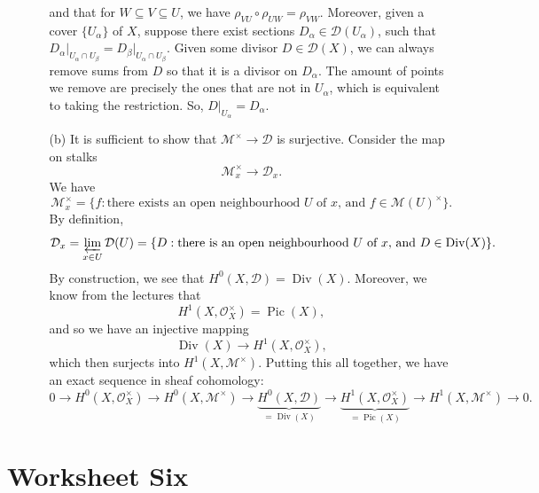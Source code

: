 \documentclass[a4paper]{report}
\theoremstyle{definition}
\theoremstyle{remark}
\theoremstyle{proposition}
\theoremstyle{conjecture}
\theoremstyle{lemma}
\theoremstyle{corollary}
\theoremstyle{exercise}
\theoremstyle{example}
\newcommand{\mcal}{\mathcal}
\newcommand{\on}{\operatorname}
\begin{document}
\begin{enumerate}
\begin{itemize}
                and that for $W \subseteq V \subseteq U$, 
                we have $\rho_{VU}\circ \rho_{UW} = \rho_{VW}.$
                Moreover, given a cover $\lbrace U_\alpha \rbrace$ of $X$, suppose
                there exist sections $D_\alpha \in \mcal{D}(U_\alpha)$, 
                such that $D_\alpha \vert_{U_\alpha \cap U_\beta} = D_\beta\vert_{U_\alpha \cap U_\beta}$. Given some divisor $D \in \mcal{D}(X)$, we can always
                remove sums from $D$ so that it is a divisor on $D_\alpha$.
                The amount of points we remove are precisely the ones that are not 
                in $U_\alpha$, which is equivalent to taking the restriction.
                So, $D\vert_{U_\alpha} = D_\alpha$.

            \item[(b)] It is sufficient to show that 
                $\mcal{M}^\times \to \mcal{D}$ is surjective.
                Consider the map on stalks 
                $$\mcal{M}^\times_x \longrightarrow \mcal{D}_x.$$
                We have $$\mcal{M}_x^\times = \lbrace f : \text{there exists an
                open neighbourhood $U$ of $x$, and $f\in\mcal{M}(U)^\times$}\rbrace.$$
                By definition,
                $$\mcal{D}_x = \varprojlim_{x \in U}\mcal{D}(U) = \lbrace D : \text{there is an open neighbourhood $U$ of $x$, and $D\in \on{Div}(X)$}\rbrace.$$
                By construction, we see that $H^0(X,\mcal{D}) = \on{Div}(X)$.
                Moreover, we know from the lectures that 
                $$H^1(X,\mcal{O}_X^\times) = \on{Pic}(X),$$
                and so we have an injective mapping 
                $$\on{Div}(X) \longrightarrow H^1(X,\mcal{O}_X^\times),$$
                which then surjects into $H^1(X,\mcal{M}^\times)$.
                Putting this all together, we have an exact sequence
                in sheaf cohomology:
                $$0 \longrightarrow H^0(X,\mcal{O}_X^\times) \longrightarrow H^0(X,\mcal{M}^\times) \longrightarrow \underbrace{H^0(X,\mcal{D})}_{=\on{Div}(X)} \longrightarrow \underbrace{H^1(X,\mcal{O}_X^\times)}_{=\on{Pic}(X)} \longrightarrow H^1(X,\mcal{M}^\times) \longrightarrow 0.$$
        \end{itemize}
\end{enumerate}

\section{Worksheet Six}
\end{document}
